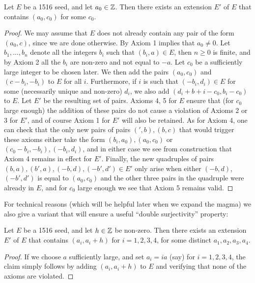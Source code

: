 \begin{lemma}[1516 extension]\label{1516-ext}  Let $E$ be a 1516 seed, and let $a_0 \in \mathbb{Z}$.  Then there exists an extension $E'$ of $E$ that contains $(a_0,c_0)$ for some $c_0$.
\end{lemma}

\begin{proof}  We may assume that $E$ does not already contain any pair of the form $(a_0,c)$, since we are done otherwise.  By Axiom 1 implies that $a_0 \neq 0$.  Let $b_1,\dots,b_n$ denote all the integers $b_i$ such that $(b_i,a) \in E$, then $n \geq 0$ is finite, and by Axiom 2 all the $b_i$ are non-zero and not equal to $-a$.  Let $c_0$ be a sufficiently large integer to be chosen later.  We then add the pairs $(a_0,c_0)$ and $(c-b_i,-b_i)$ to $E$ for all $i$.  Furthermore, if $i$ is such that $(-b_i,d_i) \in E$ for some (necessarily unique and non-zero) $d_i$, we also add $(d_i+b+i-c_0, b_i-c_0)$ to $E$.  Let $E'$ be the resulting set of pairs. Axioms 4, 5 for $E$ ensure that (for $c_0$ large enough) the addition of these pairs do not cause a violation of Axioms 2 or 3 for $E'$, and of course Axiom 1 for $E'$ will also be retained.  As for Axiom 4, one can check that the only new pairs of pairs $(',b), (b,c)$ that would trigger these axioms either take the form $(b_i,a_0), (a_0,c_0)$ or $(c_0-b_i,-b_i), (-b_i,d_i)$, and in either case we see from construction that Axiom 4 remains in effect for $E'$.  Finally, the new quadruples of pairs $(b,a), (b',a), (-b, d), (-b',d') \in E'$ only arise when either $(-b,d)$, $(-b',d')$ is equal to $(a_0,c_0)$ and the other three pairs in the quadruple were already in $E$, and for $c_0$ large enough we see that Axiom 5 remains valid.
\end{proof}

For technical reasons (which will be helpful later when we expand the magma) we also give a variant that will ensure a useful ``double surjectivity'' property:

\begin{lemma}\label{1516-ext-var}  Let $E$ be a 1516 seed, and let $h \in \mathbb{Z}$ be non-zero.  Then there exists an extension $E'$ of $E$ that contains $(a_i,a_i+h)$ for $i=1, 2, 3, 4$, for some distinct $a_1, a_2, a_3, a_4$.
\end{lemma}

\begin{proof}  If we choose $a$ sufficiently large, and set $a_i = i a$ (say) for $i=1, 2, 3, 4$, the claim simply follows by adding $(a_i,a_i+h)$ to $E$ and verifying that none of the axioms are violated.
\end{proof}


